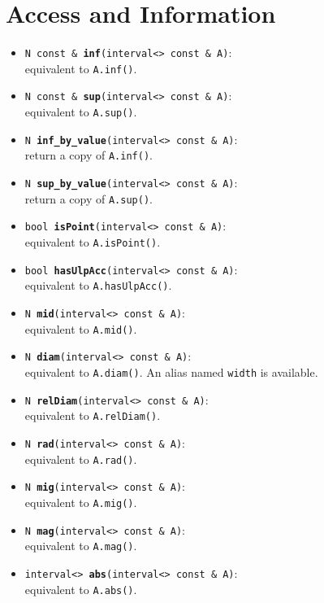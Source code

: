 \documentclass{report}
\begin{document}
\section{Access and Information}
\begin{itemize}
		\item
			\texttt{N const \& {\bf inf}(interval<> const \& A)}:\\
				equivalent to \texttt{A.inf()}.
		\item
			\texttt{N const \& {\bf sup}(interval<> const \& A)}:\\
				equivalent to \texttt{A.sup()}.
		\item
			\texttt{N {\bf inf\_by\_value}(interval<> const \& A)}:\\
				return a copy of \texttt{A.inf()}.
		\item
			\texttt{N {\bf sup\_by\_value}(interval<> const \& A)}:\\
				return a copy of \texttt{A.sup()}.
		\item
			\texttt{bool {\bf isPoint}(interval<> const \& A)}:\\
				equivalent to \texttt{A.isPoint()}.
		\item
			\texttt{bool {\bf hasUlpAcc}(interval<> const \& A)}:\\
				equivalent to \texttt{A.hasUlpAcc()}.
		\item
			\texttt{N {\bf mid}(interval<> const \& A)}:\\
				equivalent to \texttt{A.mid()}.
		\item
			\texttt{N {\bf diam}(interval<> const \& A)}:\\
				equivalent to \texttt{A.diam()}.
				An alias named \texttt{width} is
				available.
		\item
			\texttt{N {\bf relDiam}(interval<> const \& A)}:\\
				equivalent to \texttt{A.relDiam()}.
		\item
			\texttt{N {\bf rad}(interval<> const \& A)}:\\
				equivalent to \texttt{A.rad()}.
		\item
			\texttt{N {\bf mig}(interval<> const \& A)}:\\
				equivalent to \texttt{A.mig()}.
		\item
			\texttt{N {\bf mag}(interval<> const \& A)}:\\
				equivalent to \texttt{A.mag()}.
		\item
			\texttt{interval<> {\bf abs}(interval<> const \& A)}:\\
				equivalent to \texttt{A.abs()}.
\end{itemize}
\end{document}

